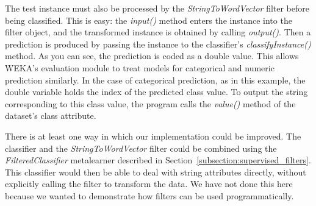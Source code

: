 The test instance must also be processed by the
\textit{StringToWordVector} filter before being classified. This is
easy: the \textit{input()} method enters the instance into the filter
object, and the transformed instance is obtained by calling
\textit{output()}. Then a prediction is produced by passing the
instance to the classifier's \textit{classifyInstance()} method. As
you can see, the prediction is coded as a double value. This allows
WEKA's evaluation module to treat models for categorical and numeric
prediction similarly. In the case of categorical prediction, as in
this example, the double variable holds the index of the predicted
class value. To output the string corresponding to this class value,
the program calls the \textit{value()} method of the dataset's class
attribute.

There is at least one way in which our implementation could be
improved. The classifier and the \textit{StringToWordVector} filter
could be combined using the \textit{FilteredClassifier} metalearner
described in Section~\ref{subsection:supervised_filters}. This
classifier would then be able to deal with string attributes directly,
without explicitly calling the filter to transform the data. We have not
done this here because we wanted to demonstrate how filters can be used
programmatically.

